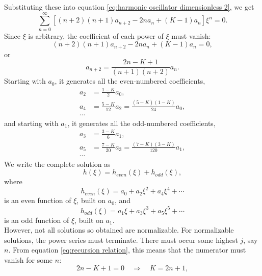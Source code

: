 \documentclass[en, oneside]{vivi}
\begin{document}
    Substituting these into equation \eqref{eq:harmonic oscillator dimensionless 2}, we get
    \begin{equation}
        \sum_{n=0}^\infty \left[ (n+2)(n+1) a_{n+2} - 2n a_n + (K - 1) a_n \right] \xi^n = 0.
    \end{equation}
    Since $\xi$ is arbitrary, the coefficient of each power of $\xi$ must vanish:
    \begin{equation}
        (n+2)(n+1) a_{n+2} - 2n a_n + (K - 1) a_n = 0,
    \end{equation}
    or
    \begin{equation} \label{eq:recursion relation}
        a_{n+2} = \frac{2n - K + 1}{(n+1)(n+2)} a_n.
    \end{equation}
    Starting with $a_0$, it generates all the even-numbered coefficients, 
    \begin{align*}
        a_2 &= \frac{1 - K}{2} a_0,\\
        a_4 &= \frac{5 - K}{12} a_2 = \frac{(5 - K)(1 - K)}{24} a_0,\\
        \cdots
    \end{align*}
    and starting with $a_1$, it generates all the odd-numbered coefficients,
    \begin{align*}
        a_3 &= \frac{3 - K}{6} a_1,\\
        a_5 &= \frac{7 - K}{20} a_3 = \frac{(7 - K)(3 - K)}{120} a_1,\\
        \cdots
    \end{align*}
    We write the complete solution as
    \begin{equation}
        h(\xi) = h_{even}(\xi) + h_{odd}(\xi),
    \end{equation}
    where
    \begin{equation*}
        h_{even}(\xi) = a_0 + a_2 \xi^2 + a_4 \xi^4 + \cdots 
    \end{equation*}
    is an even function of $\xi$, built on $a_0$, and
    \begin{equation*}
        h_{odd}(\xi) = a_1 \xi + a_3 \xi^3 + a_5 \xi^5 + \cdots
    \end{equation*}
    is an odd function of $\xi$, built on $a_1$.\\
    However, not all solutions so obtained are normalizable. For normalizable solutions, the power series must terminate. There must occur some highest $j$, say $n$. From equation \eqref{eq:recursion relation}, this means that the numerator must vanish for some $n$:
    \begin{equation}
        2n - K + 1 = 0 \quad \Rightarrow \quad K = 2n + 1,
    \end{equation}
\end{document}
